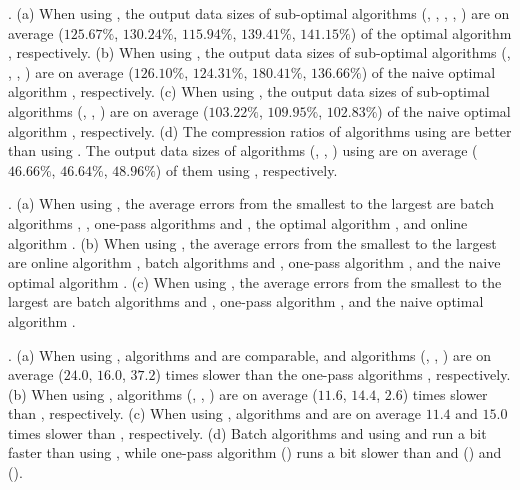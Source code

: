 \emph{}.
(a) When using \ped, the output data sizes of sub-optimal algorithms (\tpa,
\dpa, \bqsa, \siped, \operb) are on average ($125.67\%$, $130.24\%$, $115.94\%$, $139.41\%$, $141.15\%$)
of the optimal algorithm \opt, respectively.
(b) When using \sed, the output data sizes of sub-optimal algorithms (\tpa,
\dpa, \squishe, \cised) are on average ($126.10\%$, $124.31\%$, $180.41\%$, $136.66\%$) of the naive optimal algorithm \opt, respectively.
(c) When using \dad, the output data sizes of sub-optimal algorithms (\tpa,
\dpa, \interval) are on average ($103.22\%$, $109.95\%$, $102.83\%$) of the naive optimal algorithm \opt, respectively.
(d) The compression ratios of algorithms using \ped are better than
using \sed. The output data sizes of algorithms (\opt, \tpa, \dpa) using \ped
are on average ($46.66\%$, $46.64\%$, $48.96\%$) of them using \sed, respectively.

\emph{}.
(a) When using \ped, the average errors from the smallest to the largest are batch algorithms \tpa, \dpa, one-pass algorithms \siped and \operb, the optimal algorithm \opt, and online algorithm \bqsa.
(b) When using \sed, the average errors from the smallest to the largest are online algorithm \squishe, batch algorithms \tpa and \dpa, one-pass algorithm \cised, and the naive optimal algorithm \opt.
(c) When using \dad, the average errors from the smallest
to the largest are batch algorithms \dpa and \tpa, one-pass algorithm \interval, and the naive optimal algorithm \opt.

\emph{}.
(a) When using \ped, algorithms \siped and \operb are comparable, and algorithms
(\tpa, \dpa, \bqsa) are on average ($24.0$, $16.0$, $37.2$) times slower than the one-pass algorithms \siped, respectively.
(b) When using \sed, algorithms (\tpa, \dpa, \squishe) are on average ($11.6$, $14.4$, $2.6$) times slower than \cised, respectively.
(c) When using \dad, algorithms \tpa and \dpa are on average
$11.4$ and $15.0$ times slower than \interval, respectively.
(d) Batch algorithms \dpa and \tpa using \sed and \dad run a bit faster than using \ped, while one-pass algorithm \cised (\sed) runs a bit slower than \siped and \operb (\ped) and \interval (\dad).










